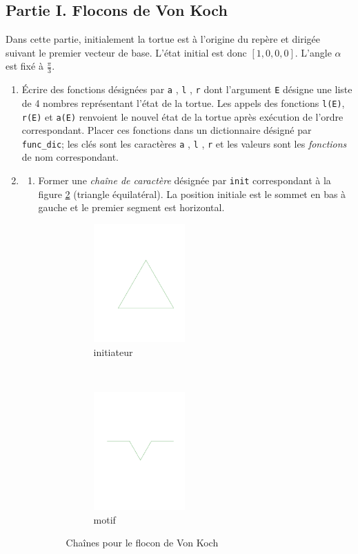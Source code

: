 \subsection*{Partie I. Flocons de Von Koch}
Dans cette partie, initialement la tortue est à l'origine du repère et dirigée suivant le premier vecteur de base. L'état initial est donc $[1,0,0,0]$. L'angle $\alpha$ est fixé à $\frac{\pi}{3}$. 
\begin{enumerate}
\item
\'Ecrire des fonctions désignées par \verb|a| , \verb|l| , \verb|r| dont l'argument \verb|E| désigne une liste de 4 nombres représentant l'état de la tortue.\newline
Les appels des fonctions \verb|l(E)|, \verb|r(E)| et \verb|a(E)| renvoient le nouvel état de la tortue après exécution de l'ordre correspondant. Placer ces fonctions dans un dictionnaire désigné par \verb|func_dic|; les clés sont les caractères \verb|a| , \verb|l| , \verb|r| et les valeurs sont les \emph{fonctions} de nom correspondant. 

 \item \begin{enumerate}
\item Former une \emph{chaîne de caractère} désignée par \verb|init| correspondant à la figure \ref{fig:Ereecriture_2} (triangle équilatéral). La position initiale est le sommet en bas à gauche et le premier segment est horizontal.

\begin{figure}[ht]
 \centering
 \begin{subfigure}[b]{4cm}
   \includegraphics[width=3.5cm]{Ereecriture_2.pdf}
   \caption{initiateur}  
 \end{subfigure} ~
 \begin{subfigure}[b]{4cm}
   \includegraphics[width=3.5cm]{Ereecriture_3.pdf}
   \caption{motif}\label{fig:Ereecriture_3} 
  \end{subfigure}
  \caption{Chaînes pour le flocon de Von Koch} \label{fig:Ereecriture_2}
\end{figure}


\end{enumerate}
\end{enumerate}
